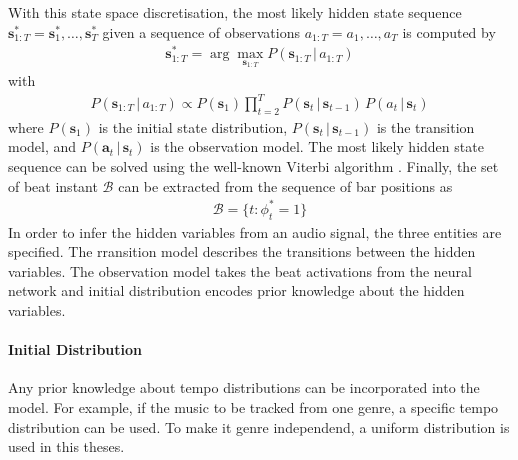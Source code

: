 \documentclass{scrartcl}
\begin{document}
With this state space discretisation, the most likely hidden state sequence $\mathbf s_{1:T}^* = \mathbf s_1^*, \dots, \mathbf s_T^*$ given a sequence of observations $a_{1:T} = a_1, \dots, a_T$ is computed by
\begin{align}
\mathbf s_{1:T}^* = \arg \max_{\mathbf s_{1:T}} P(\mathbf s_{1:T}\,|\, a_{1:T})
\label{eq:most_likely_states}
\end{align} 
with 
\begin{align}
 P(\mathbf s_{1:T}\,|\, a_{1:T}) \propto P(\mathbf s_1) \prod_{t=2}^T P(\mathbf s_t\,|\,\mathbf s_{t-1})\, P( a_t\,|\,\mathbf s_{t})
\end{align} 
where $P(\mathbf s_1)$ is the initial state distribution, $P(\mathbf s_t\,|\,\mathbf s_{t-1})$ is the transition model, and $P(\mathbf a_t\,|\,\mathbf s_{t})$ is the observation model. The most likely hidden state sequence can be solved using the well-known Viterbi algorithm \cite{Viterbi1967}. Finally, the set of beat instant $\mathcal B$ can be extracted from the sequence of bar positions as
\begin{align}
\mathcal B = \{ t: \phi_t^*=1\}
\end{align} 
In order to infer the hidden variables from an audio signal, the three entities are specified. The rransition model describes the transitions between the hidden variables. The observation model takes the beat activations from the neural network
and initial distribution encodes prior knowledge about the hidden variables.

\paragraph{Initial Distribution} 
Any prior knowledge about tempo distributions can be incorporated into the model. For example, if the music to be tracked from one genre, a specific tempo distribution can be used. To make it genre independend, a uniform distribution is used in this theses. 
\end{document}
